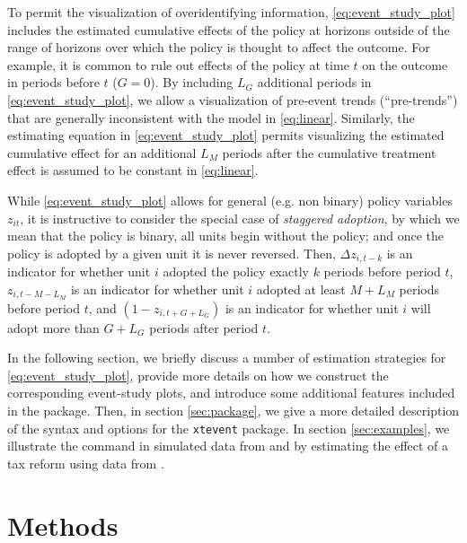 \documentclass[bib]{./sty/statapress}
\newtheorem{remark}{Remark}
\begin{document}
To permit the visualization of overidentifying information, \eqref{eq:event_study_plot} includes the estimated cumulative effects of the policy at horizons outside of the range of horizons over which the policy is thought to affect the outcome.
For example, it is common to rule out effects of the policy at time $t$ on the outcome in periods before $t$ ($G=0$).
By including $L_G$ additional periods in \eqref{eq:event_study_plot}, we allow a visualization of pre-event trends (``pre-trends'') that are generally inconsistent with the model in \eqref{eq:linear}.
Similarly, the estimating equation in \eqref{eq:event_study_plot} permits visualizing the estimated cumulative effect for an additional $L_M$ periods after the cumulative treatment effect is assumed to be constant in \eqref{eq:linear}.

While \eqref{eq:event_study_plot} allows for general (e.g. non binary) policy variables $z_{it}$, it is instructive to consider the special case of \textit{staggered adoption}, by which we mean that the policy is binary, all units begin without the policy; and once the policy is adopted by a given unit it is never reversed.
Then, $\Delta z_{i,t-k}$ is an indicator for whether unit $i$ adopted the policy exactly $k$ periods before period $t$,  $z_{i,t-M-L_M}$ is an indicator for whether unit $i$ adopted at least $M+L_M$ periods before period $t$, and $(1-z_{i,t+G+L_G})$ is an indicator for whether unit $i$ will adopt more than $G+L_G$ periods after period $t$.


In the following section, we briefly discuss a number of estimation strategies for \eqref{eq:event_study_plot}, provide more details on how we construct the corresponding event-study plots, and introduce some additional features included in the \xtevent package.
Then, in section \ref{sec:package}, we give a more detailed description of the syntax and options for the \texttt{xtevent} package.
In section \ref{sec:examples}, we illustrate the command in simulated data from \citet{freyaldenhoven2021visualization} and by estimating the effect of a tax reform using data from \citet{martinez2022mobility}.


\section{Methods}\label{sec:methods}
\end{document}

